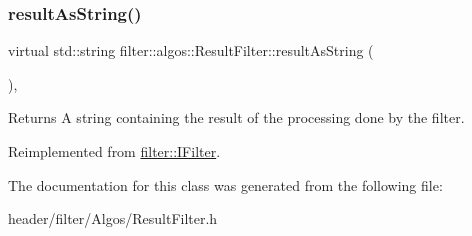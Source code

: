 \subsubsection{\texorpdfstring{result\+As\+String()}{resultAsString()}}
{\footnotesize\ttfamily virtual std\+::string filter\+::algos\+::\+Result\+Filter\+::result\+As\+String (\begin{DoxyParamCaption}{ }\end{DoxyParamCaption})\hspace{0.3cm}{\ttfamily [inline]}, {\ttfamily [virtual]}}

\begin{DoxyReturn}{Returns}
A string containing the result of the processing done by the filter. 
\end{DoxyReturn}


Reimplemented from \hyperlink{classfilter_1_1_i_filter_ab99902b060a6d9edc3452a8c9f85e37e}{filter\+::\+I\+Filter}.



The documentation for this class was generated from the following file\+:\begin{DoxyCompactItemize}
\item 
header/filter/\+Algos/Result\+Filter.\+h\end{DoxyCompactItemize}
